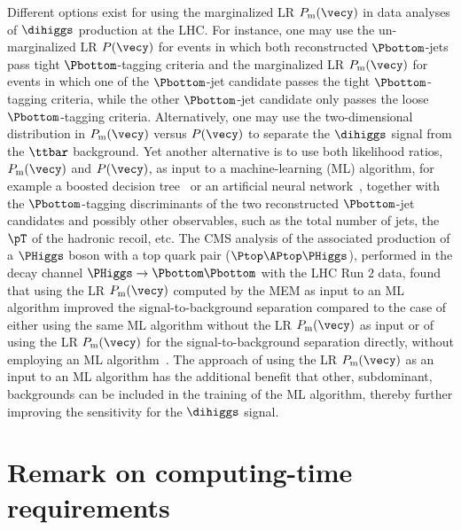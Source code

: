 Different options exist for using the marginalized LR $P_{\textrm{m}}(\vecy)$ in data analyses of $\dihiggs$ production at the LHC.
For instance, one may use the un-marginalized LR $P(\vecy)$ for events in which both reconstructed $\Pbottom$-jets pass tight $\Pbottom$-tagging criteria
and the marginalized LR $P_{\textrm{m}}(\vecy)$ for events in which one of the $\Pbottom$-jet candidate passes the tight $\Pbottom$-tagging criteria,
while the other $\Pbottom$-jet candidate only passes the loose $\Pbottom$-tagging criteria.
Alternatively, one may use the two-dimensional distribution in $P_{\textrm{m}}(\vecy)$ versus $P(\vecy)$ to separate the $\dihiggs$ signal from the $\ttbar$ background.
Yet another alternative is to use both likelihood ratios, $P_{\textrm{m}}(\vecy)$ and $P(\vecy)$,
as input to a machine-learning (ML) algorithm, for example a boosted decision tree~\cite{BDT} or an artificial neural network~\cite{ANN},
together with the $\Pbottom$-tagging discriminants of the two reconstructed $\Pbottom$-jet candidates and possibly other observables,
such as the total number of jets, the $\pT$ of the hadronic recoil, etc.
The CMS analysis of the associated production of a $\PHiggs$ boson with a top quark pair ($\Ptop\APtop\PHiggs$),
performed in the decay channel $\PHiggs \to \Pbottom\Pbottom$ with the LHC Run $2$ data,
found that using the LR $P_{\textrm{m}}(\vecy)$ computed by the MEM as input to an ML algorithm
improved the signal-to-background separation compared to the case of either using the same ML algorithm without the LR $P_{\textrm{m}}(\vecy)$ as input
or of using the LR $P_{\textrm{m}}(\vecy)$ for the signal-to-background separation directly, without employing an ML algorithm~\cite{Sirunyan:2018mvw}.
The approach of using the LR $P_{\textrm{m}}(\vecy)$ as an input to an ML algorithm has the additional benefit
that other, subdominant, backgrounds can be included in the training of the ML algorithm, thereby further improving the sensitivity for the $\dihiggs$ signal.


\section{Remark on computing-time requirements}

